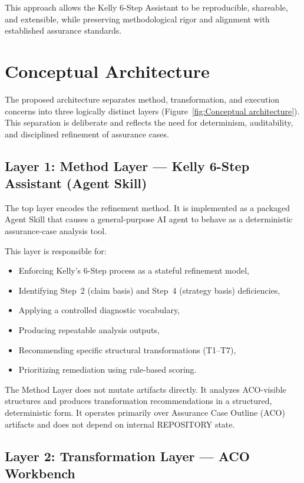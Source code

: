 \documentclass[12pt,twoside,a4paper]{article}
\begin{document}
This approach allows the Kelly 6-Step Assistant to be reproducible, shareable, and extensible, while preserving methodological rigor and alignment with established assurance standards.

\section{Conceptual Architecture}

The proposed architecture separates method, transformation, and execution concerns into three logically distinct layers (Figure~\ref{fig:Conceptual architecture}). This separation is deliberate and reflects the need for determinism, auditability, and disciplined refinement of assurance cases.

\subsection{Layer 1: Method Layer --- Kelly 6-Step Assistant (Agent Skill)}

The top layer encodes the refinement method. It is implemented as a packaged Agent Skill that causes a general-purpose AI agent to behave as a deterministic assurance-case analysis tool.

This layer is responsible for:

\begin{itemize}
  \item Enforcing Kelly’s 6-Step process as a stateful refinement model,
  \item Identifying Step~2 (claim basis) and Step~4 (strategy basis) deficiencies,
  \item Applying a controlled diagnostic vocabulary,
  \item Producing repeatable analysis outputs,
  \item Recommending specific structural transformations (T1--T7),
  \item Prioritizing remediation using rule-based scoring.
\end{itemize}

The Method Layer does not mutate artifacts directly. It analyzes ACO-visible structures and produces transformation recommendations in a structured, deterministic form. It operates primarily over Assurance Case Outline (ACO) artifacts and does not depend on internal REPOSITORY state.

\subsection{Layer 2: Transformation Layer --- ACO Workbench}
\end{document}
